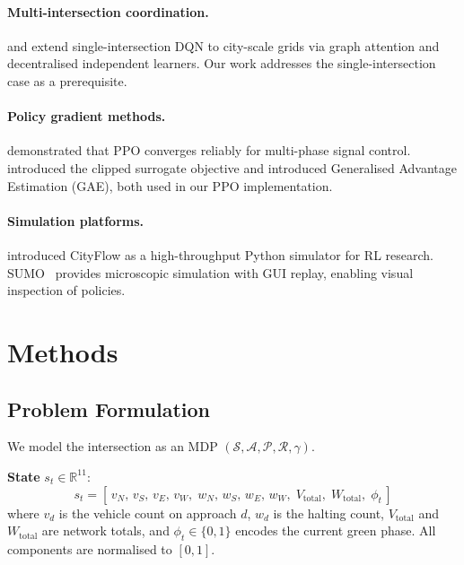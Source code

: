 \documentclass[10pt]{article}
\begin{document}
\paragraph{Multi-intersection coordination.}
\citet{wei2019colight} and \citet{chen2020toward} extend single-intersection
DQN to city-scale grids via graph attention and decentralised independent
learners.  Our work addresses the single-intersection case as a prerequisite.

\paragraph{Policy gradient methods.}
\citet{liang2019deep} demonstrated that PPO converges reliably for multi-phase
signal control.  \citet{schulman2017proximal} introduced the clipped surrogate
objective and \citet{schulman2015high} introduced Generalised Advantage
Estimation (GAE), both used in our PPO implementation.

\paragraph{Simulation platforms.}
\citet{zhang2019cityflow} introduced CityFlow as a high-throughput Python
simulator for RL research.  SUMO~\citep{behrisch2011sumo} provides
microscopic simulation with GUI replay, enabling visual inspection of policies.

\section{Methods}

\subsection{Problem Formulation}

We model the intersection as an MDP
$(\mathcal{S}, \mathcal{A}, \mathcal{P}, \mathcal{R}, \gamma)$.

\textbf{State} $s_t \in \mathbb{R}^{11}$:
\begin{equation}
s_t = [\,v_N,\, v_S,\, v_E,\, v_W,\;
        w_N,\, w_S,\, w_E,\, w_W,\;
        V_{\text{total}},\; W_{\text{total}},\; \phi_t\,]
\end{equation}
where $v_d$ is the vehicle count on approach $d$, $w_d$ is the halting count,
$V_{\text{total}}$ and $W_{\text{total}}$ are network totals, and
$\phi_t \in \{0,1\}$ encodes the current green phase.
All components are normalised to $[0,1]$.
\end{document}
